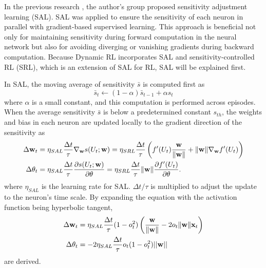 In the previous research \citep{Sensitivity},  the author's group proposed sensitivity adjustment learning (SAL).
SAL was applied to ensure the sensitivity of each neuron in parallel with gradient-based supervised learning.
This approach is beneficial not only for maintaining sensitivity during forward computation in the neural network
but also for avoiding diverging or vanishing gradients during backward computation.
Because Dynamic RL incorporates SAL and sensitivity-controlled RL (SRL), which is an extension of SAL for RL,
SAL will be explained first.

In SAL, the moving average of sensitivity $\bar{s}$ is computed first as
\begin{equation}
 \bar{s}_t \leftarrow (1-\alpha) \bar{s}_{t-1}  + \alpha s_t
 \label{Eq:Ave_sen}
\end{equation}
where $\alpha$ is a small constant, and this computation is performed across episodes.
When the average sensitivity $\bar{s}$ is below a predetermined constant $s_{th}$,
the weights and bias in each neuron are updated locally to the gradient direction of the sensitivity as
\begin{align}
\Delta {\bf w}_t &= \eta_{SAL}\frac{\Delta t}{\tau} \nabla_{\bf w} s(U_t; {\bf w})
                        = \eta_{SRL}\frac{\Delta t}{\tau} \left( f'(U_t)\frac{\bf w}{\| {\bf w} \|} + \| {\bf w} \| \nabla_{\bf w} f'(U_t) \right)
\label{Eq:SAL_ORG}\\
\Delta {\theta}_t &= \eta_{SAL} \frac{\Delta t}{\tau}\frac{\partial s(U_t; {\bf w})}{\partial \theta}
                          = \eta_{SRL}\frac{\Delta t}{\tau} \| {\bf w} \| \frac{\partial f'(U_t)}{\partial \theta}.
\label{Eq:SAL_Bias_ORG}
\end{align}
where $\eta_{SAL}$ is the learning rate for SAL.
$\Delta t / \tau$ is multiplied to adjust the update to the neuron's time scale.
By expanding the equation with the activation function being hyperbolic tangent,
\begin{align}
\Delta {\bf w}_t &= \eta_{SAL}\frac{\Delta t}{\tau} (1-o_t^2) \left( \frac{\bf w}{\| {\bf w}\|} - 2o_t\|{\bf w}\|{\bf x}_t \right)
\label{Eq:SAL} \\
\Delta {\theta}_t &= -2 \eta_{SAL}\frac{\Delta t}{\tau} o_t(1-o_t^2) ||{\bf w}||
\label{Eq:SAL_Bias}
\end{align}
are derived.

